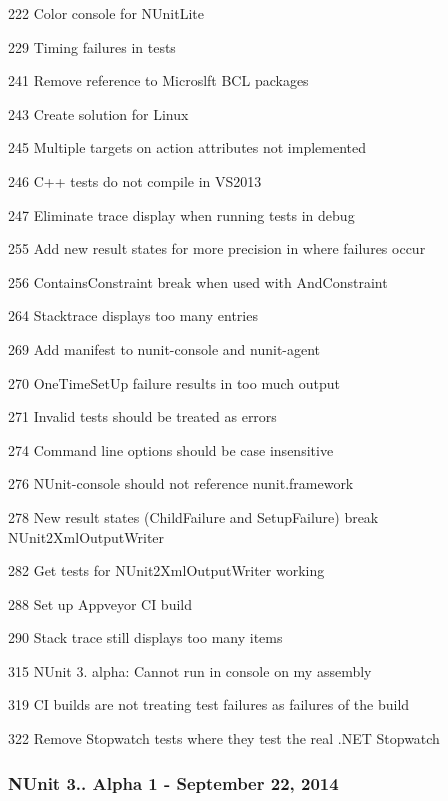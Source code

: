 \begin{DoxyItemize}
\item 222 Color console for N\+Unit\+Lite
\item 229 Timing failures in tests
\item 241 Remove reference to Microslft B\+CL packages
\item 243 Create solution for Linux
\item 245 Multiple targets on action attributes not implemented
\item 246 C++ tests do not compile in V\+S2013
\item 247 Eliminate trace display when running tests in debug
\item 255 Add new result states for more precision in where failures occur
\item 256 Contains\+Constraint break when used with And\+Constraint
\item 264 Stacktrace displays too many entries
\item 269 Add manifest to nunit-\/console and nunit-\/agent
\item 270 One\+Time\+Set\+Up failure results in too much output
\item 271 Invalid tests should be treated as errors
\item 274 Command line options should be case insensitive
\item 276 N\+Unit-\/console should not reference nunit.\+framework
\item 278 New result states (Child\+Failure and Setup\+Failure) break N\+Unit2\+Xml\+Output\+Writer
\item 282 Get tests for N\+Unit2\+Xml\+Output\+Writer working
\item 288 Set up Appveyor CI build
\item 290 Stack trace still displays too many items
\item 315 N\+Unit 3. alpha\+: Cannot run in console on my assembly
\item 319 CI builds are not treating test failures as failures of the build
\item 322 Remove Stopwatch tests where they test the real .N\+ET Stopwatch
\end{DoxyItemize}

\subsubsection*{N\+Unit 3.. Alpha 1 -\/ September 22, 2014}

